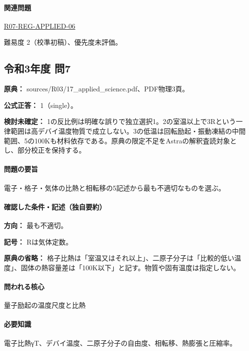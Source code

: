 \paragraph{関連問題} \hyperref[q:r07-reg-applied-06]{R07-REG-APPLIED-06}

\par 難易度 2（校準初稿）、優先度未評価。

\subsection{令和3年度 問7}
\label{q:r03-reg-applied-07}

\noindent\textbf{原典：} sources/R03/17\_applied\_science.pdf、PDF物理3頁。

\textbf{公式正答：} 1（single）。

\par\textbf{検討未確定：} 1の反比例は明確な誤りで独立選択1。2の室温以上で3Rという一律範囲は高デバイ温度物質で成立しない。3の低温は回転励起・振動凍結の中間範囲、5の100Kも材料依存である。原典の限定不足をAstraの解釈査読対象とし、部分校正を保持する。

\paragraph{問題の要旨} 電子・格子・気体の比熱と相転移の5記述から最も不適切なものを選ぶ。

\paragraph{確認した条件・記述（独自要約）}\mbox{}\par

\noindent\textbf{方向：} 最も不適切。\par

\noindent\textbf{記号：} Rは気体定数。\par

\noindent\textbf{原典の省略：} 格子比熱は「室温又はそれ以上」、二原子分子は「比較的低い温度」、固体の熱容量差は「100K以下」と記す。物質や固有温度は指定しない。\par

\paragraph{問われる核心} 量子励起の温度尺度と比熱

\paragraph{必要知識} 電子比熱γT、デバイ温度、二原子分子の自由度、相転移、熱膨張と圧縮率。


